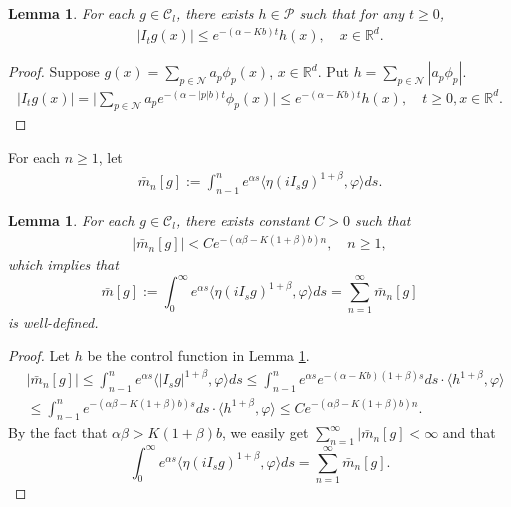 \documentclass[12pt,a4paper]{amsart}
\theoremstyle{plain}
\newtheorem{lem}[thm]{Lemma}
\theoremstyle{definition}
\numberwithin{equation}{section}
\begin{document}
\begin{lem}\label{lem: control of Isg}
 For each $g\in \mathcal{C}_l$, there exists $h\in \mathcal{P}$ such that  for any $t\geq 0$,
\begin{align}
    |I_tg(x)|\leq e^{-(\alpha-Kb)t}h(x),\quad x\in \mathbb{R}^d.
\end{align}
\end{lem}
\begin{proof}
Suppose $g(x)=\sum_{p\in \mathcal{N}}a_p\phi_p(x)$, $x\in\mathbb{R}^d$.  Put  $h=\sum_{p\in \mathcal{N}}|a_p\phi_p|$.
\begin{align}
    |I_tg(x)|=\Big|\sum_{p\in\mathcal{N}}a_pe^{-(\alpha-|p|b)t}\phi_p(x)\Big|\leq e^{-(\alpha-Kb)t}h(x),\quad t\geq 0,x\in \mathbb{R}^d.
\end{align}
\end{proof}
For each  $n\geq 1$, let
\begin{align}
    \bar{m}_n[g]:=\int_{n-1}^n e^{\alpha s}\langle \eta(iI_sg)^{1+\beta},\varphi\rangle ds.
\end{align}
\begin{lem}\label{lem: control of mn}
For each $g\in \mathcal{C}_l$,  there exists constant $C>0$ such that
 \begin{align}
     |\bar{m}_n[g]|< C e^{-(\alpha\beta-K(1+\beta)b)n}, \quad n\geq 1,
 \end{align}
which implies that
\begin{equation}\label{sum-bar-m}\bar{m}[g]:=\int_{0}^\infty e^{\alpha s}\langle \eta(iI_sg)^{1+\beta},\varphi\rangle ds=\sum_{n=1}^{\infty}\bar{m}_n[g]\end{equation}
is well-defined.
\end{lem}
\begin{proof}
Let $h$ be the control function in Lemma \ref{lem: control of Isg}.
\begin{align}
    &|\bar{m}_n[g]|\leq \int_{n-1}^n e^{\alpha s}\langle |I_sg|^{1+\beta}, \varphi\rangle ds\leq \int_{n-1}^n e^{\alpha s}e^{-(\alpha-Kb)(1+\beta)s}ds\cdot \langle h^{1+\beta}, \varphi\rangle\\
    &\leq \int_{n-1}^n e^{-(\alpha\beta-K(1+\beta)b)s}ds\cdot\langle h^{1+\beta}, \varphi\rangle
    \leq C e^{-(\alpha\beta-K(1+\beta)b)n}.
\end{align}
By the fact that $\alpha\beta>K(1+\beta)b$, we easily get
$\sum_{n=1}^{\infty}|\bar{m}_n[g]<\infty$ and that  $$\int_{0}^\infty e^{\alpha s}\langle \eta(iI_sg)^{1+\beta},\varphi\rangle ds=\sum_{n=1}^{\infty}\bar{m}_n[g].$$
\end{proof}
\end{document}
